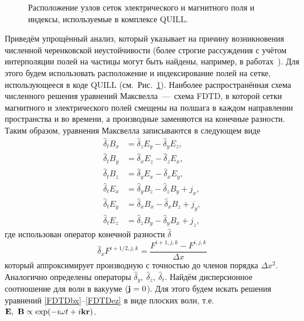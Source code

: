 \begin{figure}[ht]
    \caption{Расположение узлов сеток электрического и магнитного поля и индексы, используемые в комплексе QUILL.}
    \label{fig:ch3/sec4/Quill_indecies}
\end{figure}
Приведём упрощённый анализ, который указывает на причину возникновения численной черенковской неустойчивости (более строгие рассуждения с учётом интерполяции полей на частицы могут быть найдены, например, в работах~\cite{xu2013numerical, godfrey2013numerical}).
Для этого будем использовать расположение и индексирование полей на сетке, использующееся в коде QUILL (см.~Рис.~\ref{fig:ch3/sec4/Quill_indecies}).
Наиболее распространённая схема численного решения уравнений Максвелла~---~схема FDTD, в которой сетки магнитного и электрического полей смещены на полшага в каждом направлении пространства и во времени, а производные заменяются на конечные разности.
Таким образом, уравнения Максвелла записываются в следующем виде
\begin{align}
    \label{FDTDbx}
    \hat{\delta}_t B_x &= \hat{\delta}_z E_y - \hat{\delta}_y E_z, \\
    \label{FDTDby}
    \hat{\delta}_t B_y &= \hat{\delta}_x E_z - \hat{\delta}_z E_x, \\
    \label{FDTDbz}
    \hat{\delta}_t B_z &= \hat{\delta}_y E_x - \hat{\delta}_x E_y, \\
    \label{FDTDex}
    \hat{\delta}_t E_x &= \hat{\delta}_y B_z - \hat{\delta}_z B_y + j_x, \\
    \label{FDTDey}
    \hat{\delta}_t E_y &= \hat{\delta}_x B_x - \hat{\delta}_x B_z + j_y, \\
    \label{FDTDez}
    \hat{\delta}_t E_z &= \hat{\delta}_z B_y - \hat{\delta}_y B_x + j_z,
\end{align}
где использован оператор конечной разности $\hat{\delta}$
\begin{equation}
    \hat{\delta}_x F^{i+1/2,j,k}=\frac{F^{i+1,j,k}-F^{i,j,k}}{\Delta x}
\end{equation}
который аппроксимирует производную с точностью до членов порядка $\Delta x^2$.
Аналогично определены операторы $\hat{\delta}_y,\ \hat{\delta}_z,\ \hat{\delta}_t$.
Найдём дисперсионное соотношение для волн в вакууме ($\vb{j}=0$).
Для этого будем искать решения уравнений \eqref{FDTDbx}--\eqref{FDTDez} в виде плоских волн, т.е. $\vb{E},\ \vb{B} \propto \exp(-i\omega t + i \vb{kr})$.
